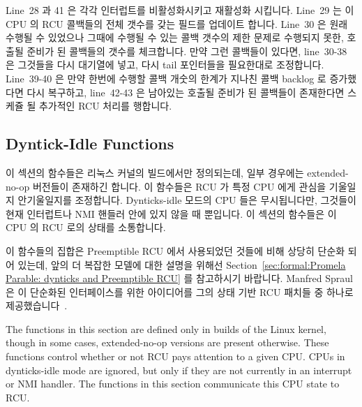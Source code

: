 Line~28 과 41 은 각각 인터럽트를 비활성화시키고 재활성화 시킵니다.
Line~29 는 이 CPU 의 RCU 콜백들의 전체 갯수를 갖는  필드를 업데이트
합니다.
Line~30 은 원래 수행될 수 있었으나 그때에 수행될 수 있는 콜백 갯수의 제한
문제로 수행되지 못한, 호출될 준비가 된 콜백들의 갯수를 체크합니다.
만약 그런 콜백들이 있다면, line~30-38 은 그것들을 다시 대기열에 넣고, 다시 tail
포인터들을 필요한대로 조정합니다.
Line~39-40 은 만약 한번에 수행할 콜백 개숫의 한계가 지나친 콜백 backlog 로
증가했다면 다시 복구하고, line~42-43 은 남아있는 호출될 준비가 된 콜백들이
존재한다면 스케쥴 될 추가적인 RCU 처리를 행합니다.
\iffalse

Lines~28 and 41 disable and re-enable interrupts, respectively.
Line~29 updates the \co{->qlen} field, which maintains a count
of the total number of RCU callbacks for this CPU.
Line~30 checks to see if there were any ready-to-invoke callbacks
that could not be invoked at the moment due to the limit on the
number that may be invoked at a given time.
If such callbacks remain, lines~30-38 requeue them, again adjusting
the tail pointers as needed.
Lines~39-40 restore the batch limit if it was increased due to
excessive callback backlog, and lines~42-43 cause additional RCU
processing to be scheduled if there are any ready-to-invoke
callbacks remaining.
\fi

\subsection{Dyntick-Idle Functions}
\label{app:rcuimpl:rcutreewt:Dyntick-Idle Functions}

이 섹션의 함수들은 리눅스 커널의  빌드에서만 정의되는데, 일부
경우에는 extended-no-op 버전들이 존재하긴 합니다.
이 함수들은 RCU 가 특정 CPU 에게 관심을 기울일지 안기울일지를 조정합니다.
Dynticks-idle 모드의 CPU 들은 무시됩니다만, 그것들이 현재 인터럽트나 NMI 핸들러
안에 있지 않을 때 뿐입니다.
이 섹션의 함수들은 이 CPU 의 RCU 로의 상태를 소통합니다.

이 함수들의 집합은 Preemptible RCU 에서 사용되었던 것들에 비해 상당히 단순화
되어 있는데, 앞의 더 복잡한 모델에 대한 설명을 위해선
Section~\ref{sec:formal:Promela Parable: dynticks and Preemptible RCU} 를
참고하시기 바랍니다.
Manfred Spraul 은 이 단순화된 인터페이스를 위한 아이디어를 그의 상태 기반 RCU
패치들 중 하나로
제공했습니다~\cite{ManfredSpraul2008StateMachineRCU,ManfredSpraul2008dyntickIRQNMI}.
\iffalse

The functions in this section are defined only in 
builds of the Linux kernel,
though in some cases, extended-no-op versions are present otherwise.
These functions control whether or not RCU pays attention to a given CPU.
CPUs in dynticks-idle mode are ignored, but only if they are not
currently in an interrupt or NMI handler.
The functions in this section communicate this CPU state to RCU.

